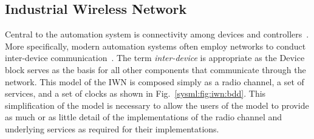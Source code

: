 \subsection{Industrial Wireless Network}

Central to the automation system is connectivity among devices and controllers~\cite{controlWSAN2010}.  More specifically, modern automation systems often employ networks to conduct inter-device communication~\cite{wirelessAutomation2017}.  The term \textit{inter-device} is appropriate as the Device block serves as the basis for all other components that communicate through the network.  This model of the IWN is composed simply as a radio channel, a set of services, and a set of clocks as shown in Fig.~\ref{sysml:fig:iwn:bdd}.  This simplification of the model is necessary to allow the users of the model to provide as much or as little detail of the implementations of the radio channel and underlying services as required for their implementations.


